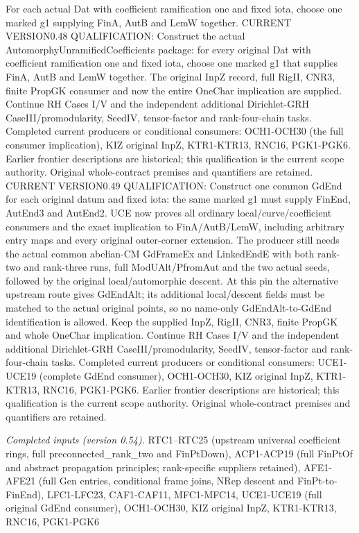 \documentclass[11pt,a4paper]{article}
\numberwithin{equation}{section}
\theoremstyle{remark}\newtheorem{remark}[theorem]{Remark}
\begin{document}
For each actual Dat with coefficient ramification one and fixed iota, choose one marked g1 supplying FinA, AutB and LemW together. CURRENT VERSION0.48 QUALIFICATION: Construct the actual AutomorphyUnramifiedCoefficients package: for every original Dat with coefficient ramification one and fixed iota, choose one marked g1 that supplies FinA, AutB and LemW together. The original InpZ record, full RigII, CNR3, finite PropGK consumer and now the entire OneChar implication are supplied. Continue RH Cases I/V and the independent additional Dirichlet-GRH CaseIII/promodularity, SeedIV, tensor-factor and rank-four-chain tasks. Completed current producers or conditional consumers: OCH1-OCH30 (the full consumer implication), KIZ original InpZ, KTR1-KTR13, RNC16, PGK1-PGK6. Earlier frontier descriptions are historical; this qualification is the current scope authority. Original whole-contract premises and quantifiers are retained. CURRENT VERSION0.49 QUALIFICATION: Construct one common GdEnd for each original datum and fixed iota: the same marked g1 must supply FinEnd, AutEnd3 and AutEnd2. UCE now proves all ordinary local/curve/coefficient consumers and the exact implication to FinA/AutB/LemW, including arbitrary entry maps and every original outer-corner extension. The producer still needs the actual common abelian-CM GdFrameEx and LinkedEndE with both rank-two and rank-three runs, full ModUAlt/PfromAut and the two actual seeds, followed by the original local/automorphic descent. At this pin the alternative upstream route gives GdEndAlt; its additional local/descent fields must be matched to the actual original points, so no name-only GdEndAlt-to-GdEnd identification is allowed. Keep the supplied InpZ, RigII, CNR3, finite PropGK and whole OneChar implication. Continue RH Cases I/V and the independent additional Dirichlet-GRH CaseIII/promodularity, SeedIV, tensor-factor and rank-four-chain tasks. Completed current producers or conditional consumers: UCE1-UCE19 (complete GdEnd consumer), OCH1-OCH30, KIZ original InpZ, KTR1-KTR13, RNC16, PGK1-PGK6. Earlier frontier descriptions are historical; this qualification is the current scope authority. Original whole-contract premises and quantifiers are retained.

\emph{Completed inputs (version 0.54).} RTC1–RTC25 (upstream universal coefficient rings, full preconnected\_\allowbreak rank\_\allowbreak two and FinPtDown), ACP1-ACP19 (full FinPtOf and abstract propagation principles; rank-specific suppliers retained), AFE1-AFE21 (full Gen entries, conditional frame joins, NRep descent and FinPt-to-FinEnd), LFC1-LFC23, CAF1-CAF11, MFC1-MFC14, UCE1-UCE19 (full original GdEnd consumer), OCH1-OCH30, KIZ original InpZ, KTR1-KTR13, RNC16, PGK1-PGK6
\end{document}
